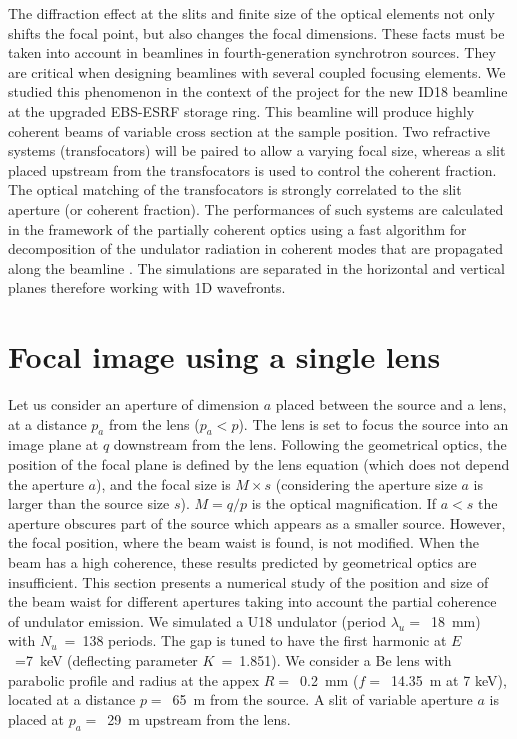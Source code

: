 \documentclass[9pt,twocolumn,twoside]{osajnl}
\begin{document}
The diffraction effect at the slits and finite size of the optical elements not only shifts the focal point, but also changes the focal dimensions. These facts must be taken into account in beamlines in fourth-generation synchrotron sources. They are critical when designing beamlines with several coupled focusing elements. We studied this phenomenon in the context of the project for the new ID18 beamline at the upgraded EBS-ESRF storage ring. This beamline will produce highly coherent beams of variable cross section at the sample position. Two refractive systems (transfocators) will be paired to allow a varying focal size, whereas a slit placed upstream from the transfocators is used to control the coherent fraction. The optical matching of the transfocators is strongly correlated to the slit aperture (or coherent fraction). The performances of such systems are calculated in the framework of the partially coherent optics using a fast algorithm for decomposition of the undulator radiation in coherent modes that are propagated along the beamline \cite{delrio2021pairing}. The simulations are separated in the horizontal and vertical planes therefore working with 1D wavefronts.

\section{Focal image using a single lens}
\label{sec:onelens}

Let us consider an aperture of dimension $a$ placed between the source and a lens, at a distance $p_a$ from the lens ($p_a < p$). The lens is set to focus the source into an image plane at $q$ downstream from the lens. Following the geometrical optics, the position of the focal plane is defined by the lens equation (which does not depend the aperture $a$), and the focal size is $M \times s$  (considering the aperture size $a$ is larger than the source size $s$). $M = q/p$ is the optical magnification. If $a<s$ the aperture obscures part of the source which appears as a smaller source. However, the focal position, where the beam waist is found, is not modified. When the beam has a high coherence, these results predicted by geometrical optics are insufficient. This section presents a numerical study of the position and size of the beam waist for different apertures taking into account the partial coherence of undulator emission. We simulated a U18 undulator (period $\lambda_u=$~\SI{18}{\milli\meter}) with $N_u$~=~138 periods. The gap is tuned to have the first harmonic at $E$~=7~keV (deflecting parameter $K$~=~1.851). We consider a Be lens with parabolic profile and radius at the appex $R=$~\SI{0.2}{\milli\meter} ($f=$~\SI{14.35}{\meter} at 7 keV), located at a distance $p=$~\SI{65}{\meter} from the source. A slit of variable aperture $a$ is placed at $p_a=$~\SI{29}{\meter} upstream from the lens. 
\end{document}
